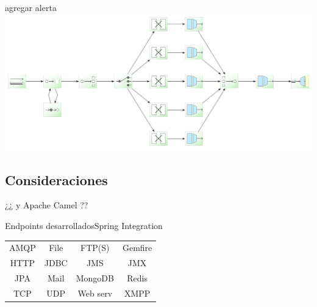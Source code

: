 \documentclass{beamer}
\begin{document}
\begin{frame}{agregar alerta}
\includegraphics[width=1.1\linewidth]{sp-int-30}
\end{frame}

\subsection{Consideraciones}

\begin{frame}
\begin{center}
\Large{¿¿ y Apache Camel ??}
\end{center}
\end{frame}

\begin{frame}[fragile]{Endpoints desarrollados}{Spring Integration}
\begin{center}
\begin{tabular}{c c c c}
AMQP & File & FTP(S) & Gemfire \\
HTTP & JDBC & JMS & JMX \\
JPA & Mail & MongoDB & Redis \\
TCP & UDP & Web serv & XMPP
\end{tabular}
\end{center}
\end{frame}
\end{document}
